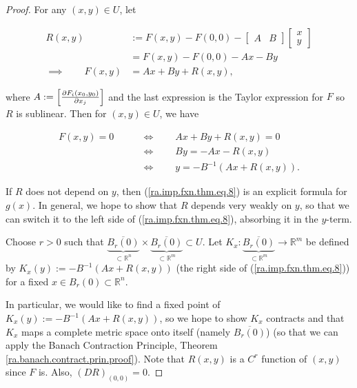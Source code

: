 \begin{proof}

For any \((x,y) \in U\), let 

\begin{align*}
R(x,y) & := F(x,y) - F(0,0) - \begin{bmatrix} A & B \end{bmatrix} \begin{bmatrix} x \\ y \end{bmatrix}
\\ & = F(x,y) - F(0,0) - Ax - By
\\ \implies \qquad F(x,y) & = Ax + By + R(x,y),
\end{align*}

where \(A := \begin{bmatrix} \pderiv{F_i(x_0, y_0)}{x_j} \end{bmatrix}\) and the last expression is the Taylor expression for \(F\) so \(R\) is sublinear. Then for \((x,y) \in U\), we have 

\begin{align}
F(x,y) = 0 \qquad & \iff \qquad Ax + By + R(x,y) = 0 \nonumber
\\ & \iff \qquad By = -Ax - R(x,y) \nonumber
\\ & \iff \qquad y = -B^{-1}(Ax + R(x,y)). \label{ra.imp.fxn.thm.eq.8}
\end{align}

If \(R\) does not depend on \(y\), then (\ref{ra.imp.fxn.thm.eq.8}) is an explicit formula for \(g(x)\). In general, we hope to show that \(R\) depends very weakly on \(y\), so that we can switch it to the left side of (\ref{ra.imp.fxn.thm.eq.8}), absorbing it in the \(y\)-term. 

Choose \(r > 0\) such that \(\underbrace{\overline{B_r(0)}}_{\subset \mathbb{R}^n} \times  \underbrace{\overline{B_r(0)}}_{\subset \mathbb{R}^m} \subset U\). Let \(K_x: \underbrace{\overline{B_r(0)}}_{\subset \mathbb{R}^m} \to \mathbb{R}^m\) be defined by \(K_x(y) := -B^{-1}(Ax + R(x,y))\) (the right side of (\ref{ra.imp.fxn.thm.eq.8})) for a fixed \(x \in B_r(0) \subset \mathbb{R}^n\).


In particular, we would like to find a fixed point of \(K_x(y) := -B^{-1}(Ax + R(x,y))\), so we hope to show \(K_x\) contracts and that \(K_x\) maps a complete metric space onto itself (namely \(\overline{B_r(0)}\)) (so that we can apply the Banach Contraction Principle, Theorem \ref{ra.banach.contract.prin.proof}). Note that \(R(x,y)\) is a \(C^r\) function of \((x,y)\) since \(F\) is. Also, \((DR)_{(0,0)} = 0\).


\end{proof}
